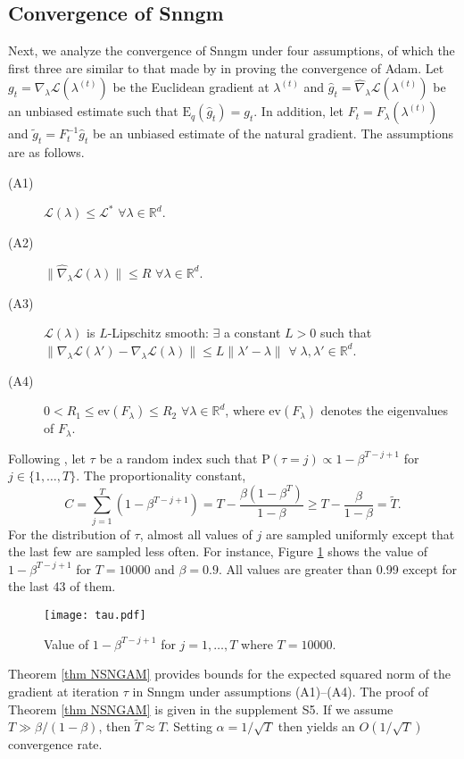 \documentclass{statsoc}
\newcommand\ev{{\text{ev}} }
\newcommand\E{{\text{E}}}
\newcommand\mL{{\mathcal{L}}}
\newcommand{\Prob}{\text{P}}
\begin{document}
\subsection{Convergence of Snngm}
Next, we analyze the convergence of Snngm under four assumptions, of which the first three are similar to that made by \cite{Defossez2020} in proving the convergence of Adam. Let $g_t = \nabla_\lambda \mL(\lambda^{(t)})$ be the Euclidean gradient at $\lambda^{(t)}$ and  $\widehat{g}_t = \widehat{\nabla}_\lambda \mL(\lambda^{(t)})$ be an unbiased estimate such that $\E_q(\widehat{g}_t) = g_t$. In addition, let $F_t = F_\lambda(\lambda^{(t)})$ and $\widetilde{g}_t = F_t^{-1} \widehat{g}_t $ be an unbiased estimate of the natural gradient. The assumptions are as follows.
\begin{description}
\item[(A1)] $\mL(\lambda) \leq \mL^*$ $\forall \lambda \in \mathbb{R}^d$.
\item[(A2)] $\| \widehat{\nabla}_\lambda \mL (\lambda) \| \leq R$ $\forall \lambda \in \mathbb{R}^d$.
\item[(A3)] $\mL(\lambda)$ is $L$-Lipschitz smooth: $\exists$ a constant $L > 0$ such that $\| \nabla_\lambda \mL(\lambda') - \nabla_\lambda \mL(\lambda) \| \leq L \| \lambda' - \lambda \|$ $\forall \; \lambda, \lambda' \in \mathbb{R}^d$.
\item[(A4)] $0 < R_1 \leq \ev(F_\lambda) \leq R_2$ $\forall \lambda \in \mathbb{R}^d$, where $\ev(F_\lambda)$ denotes the eigenvalues of $F_\lambda$.
\end{description}
Following \cite{Defossez2020}, let $\tau$ be a random index such that $\Prob(\tau=j) \propto 1 - \beta^{T-j+1}$ for $j  \in \{1, \dots, T\}$. The proportionality constant,
\[
C = \sum_{j=1}^T  (1-\beta^{T-j+1}) = T - \frac{\beta(1-\beta^T )}{1-\beta} \geq  T - \frac{\beta}{1-\beta} = \widetilde{T}.
\]
For the distribution of $\tau$, almost all values of $j$ are sampled uniformly except that the last few are sampled less often. For instance, Figure \ref{Fig2} shows the value of $1 - \beta^{T-j+1}$ for $T=10000$ and $\beta = 0.9$. All values are greater than 0.99 except for the last 43 of them. 
\begin{figure}[htb!]
\centering 
\texttt{[image: tau.pdf]}
\caption{Value of $1 - \beta^{T-j+1}$ for $j=1, \dots, T$ where $T=10000$.}
\label{Fig2}
\end{figure}

Theorem \ref{thm NSNGAM} provides bounds for the expected squared norm of the gradient at iteration $\tau$ in Snngm under assumptions (A1)--(A4). The proof of Theorem \ref{thm NSNGAM} is given in the supplement S5. If we assume $T \gg \beta/(1-\beta)$, then $\widetilde{T} \approx T$. Setting $\alpha = 1/\sqrt{T}$ then yields an $O(1/\sqrt{T})$ convergence rate. 
\end{document}
